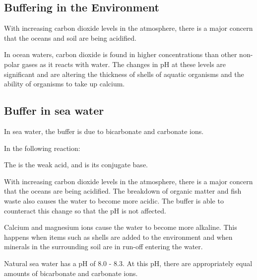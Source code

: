 	\subsection{Buffering in the Environment}
	
		With increasing carbon dioxide levels in the atmosphere, there is a major concern that the oceans and soil are being acidified.

		In ocean waters, carbon dioxide is found in higher concentrations than other non-polar gases as it reacts with water. The changes in pH at these levels are significant and are altering the thickness of shells of aquatic organisms and the ability of organisms to take up calcium.

	\subsection{Buffer in sea water}
	
		In sea water, the buffer is due to bicarbonate and carbonate ions.

		In the following reaction:

		\begin{center}
		\end{center}

		The  is the weak acid, and  is its conjugate base.

		With increasing carbon dioxide levels in the atmosphere, there is a major concern that the oceans are being acidified. The breakdown of organic matter and fish waste also causes the water to become more acidic. The buffer is able to counteract this change so that the pH is not affected.

		Calcium and magnesium ions cause the water to become more alkaline. This happens when items such as shells are added to the environment and when minerals in the surrounding soil are in run-off entering the water.

		Natural sea water has a pH of 8.0 - 8.3. At this pH, there are appropriately equal amounts of bicarbonate and carbonate ions.
